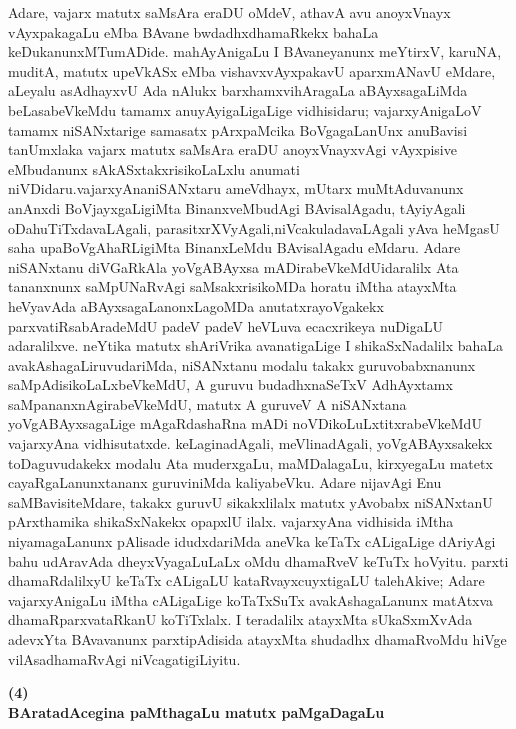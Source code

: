 Adare, vajarx matutx saMsAra eraDU oMdeV, athavA avu anoyxVnayx vAyxpaka\break\-gaLu eMba BAvane bwdadhxdhamaRkekx bahaLa keDukanunxMTumADide. mahAyAnigaLu I BAvaneyanunx meYtirxV, karuNA, muditA, matutx upeVkASx eMba vishavxvAyxpakavU aparxmANavU eMdare, aLeyalu asAdhayxvU Ada nAlukx barxhamxvihAragaLa aBAyxsa\-gaLiMda beLasabeVkeMdu tamamx anuyAyigaLigaLige vidhisidaru; vajarxyAnigaLoV tamamx niSANxtarige samasatx pArxpaMcika BoVgagaLanUnx anuBavisi tanUmxlaka vajarx matutx saMsAra eraDU anoyxVnayxvAgi vAyxpisive eMbudanunx sAkASxtakxrisikoLaLxlu anumati niVDi\-daru.\break vajarxyAnaniSANxtaru ameVdhayx, mUtarx muMtAduvanunx anAnxdi BoVjayxgaLigiMta Binanx\break\-veMbudAgi BAvisalAgadu, tAyiyAgali oDahuTiTxdavaLAgali, parasitxrXVyAgali,\break niVcakuladavaLAgali yAva heMgasU saha upaBoVgAhaRLigiMta BinanxLeMdu BAvisa\-lAgadu eMdaru. Adare niSANxtanu diVGaRkAla yoVgABAyxsa mADirabeVkeMdU\break idaralilx Ata tananxnunx saMpUNaRvAgi saMsakxrisikoMDa horatu iMtha atayxMta heVya\-vAda aBAyxsagaLanonxLagoMDa anutatxrayoVgakekx parxvatiRsabAradeMdU padeV padeV heVLuva ecacxrikeya nuDigaLU adaralilxve. neYtika matutx shAriVrika avanatigaLige I shikaSxNa\-dalilx bahaLa avakAshagaLiruvudariMda, niSANxtanu modalu takakx guruvobabxnanunx saMpA\-disikoLaLxbeVkeMdU, A guruvu budadhxnaSeTxV AdhAyxtamx saMpananxnAgirabeVkeMdU, matutx A guruveV A niSANxtana yoVgABAyxsagaLige mAgaRdashaRna mADi noVDikoLuLx\-titxrabeVkeMdU vajarxyAna vidhisutatxde. keLaginadAgali, meVlinadAgali, yoVgABAyxsakekx toDaguvudakekx modalu Ata muderxgaLu, maMDalagaLu, kirxyegaLu matetx cayaR\-gaLanunx\break tananx guruviniMda kaliyabeVku. Adare nijavAgi Enu saMBavisiteMdare, takakx \hbox{guruvU} sikakxlilalx matutx yAvobabx niSANxtanU pArxthamika shikaSxNakekx opapxlU ilalx. vajarxyAna vidhi\-sida iMtha niyamagaLanunx pAlisade idudxdariMda aneVka keTaTx cALigaLige dAriyAgi bahu udAravAda dheyxVyagaLuLaLx oMdu dhamaRveV keTuTx hoVyitu. parxti dhamaR\-dalilxyU keTaTx cALigaLU kataRvayxcuyxtigaLU talehAkive; Adare vajarxyAnigaLu iMtha cALigaLige koTaTxSuTx avakAshagaLanunx matAtxva dhamaRparxvataRkanU koTiTxlalx. I teradalilx atayxMta sUkaSxmXvAda adevxYta BAvavanunx parxtipAdisida atayxMta shudadhx dhamaRvoMdu hiVge vilAsadhamaRvAgi niVcagatigiLiyitu.

\begin{center}
{\textbf{\Large (4)}}\\[5pt]
{\textbf{\Large BAratadAcegina paMthagaLu matutx paMgaDagaLu}}
\end{center}

